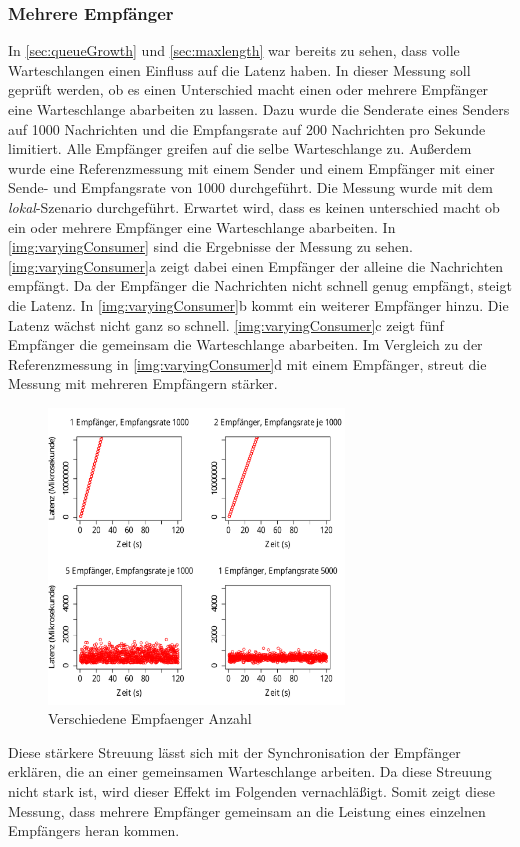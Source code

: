 \subsubsection{Mehrere Empfänger}
\label{sec:varyingConsumer}
In \autoref{sec:queueGrowth} und \autoref{sec:maxlength} war bereits zu sehen, dass volle Warteschlangen einen Einfluss auf die Latenz haben. In dieser Messung soll geprüft werden, ob es einen Unterschied macht einen oder mehrere Empfänger eine Warteschlange abarbeiten zu lassen. Dazu wurde die Senderate eines Senders auf 1000 Nachrichten und die Empfangsrate auf 200 Nachrichten pro Sekunde limitiert. Alle Empfänger greifen auf die selbe Warteschlange zu. Außerdem wurde eine Referenzmessung mit einem Sender und einem Empfänger mit einer Sende- und Empfangsrate von 1000 durchgeführt. Die Messung wurde mit dem \textit{lokal}-Szenario durchgeführt. Erwartet wird, dass es keinen unterschied macht ob ein oder mehrere Empfänger eine Warteschlange abarbeiten.
In \autoref{img:varyingConsumer} sind die Ergebnisse der Messung zu sehen. \autoref{img:varyingConsumer}a zeigt dabei einen Empfänger der alleine die Nachrichten empfängt. Da der Empfänger die Nachrichten nicht schnell genug empfängt, steigt die Latenz. In \autoref{img:varyingConsumer}b kommt ein weiterer Empfänger hinzu. Die Latenz wächst nicht ganz so schnell. \autoref{img:varyingConsumer}c zeigt fünf Empfänger die gemeinsam die Warteschlange abarbeiten. Im Vergleich zu der Referenzmessung in \autoref{img:varyingConsumer}d mit einem Empfänger, streut die Messung mit mehreren Empfängern stärker.
\begin{figure}
\center
  \includegraphics[width=0.7\textwidth]{images/measurement/varying-consumer.pdf}
  \caption{Verschiedene Empfaenger Anzahl}
  \label{img:varyingConsumer}
\end{figure}
Diese stärkere Streuung lässt sich mit der Synchronisation der Empfänger erklären, die an einer gemeinsamen Warteschlange arbeiten. Da diese Streuung nicht stark ist, wird dieser Effekt im Folgenden vernachläßigt. Somit zeigt diese Messung, dass mehrere Empfänger gemeinsam an die Leistung eines einzelnen Empfängers heran kommen. 


